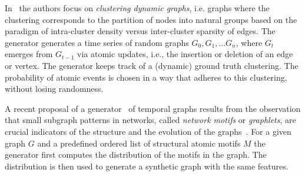 In~\cite{GoerkeKlugeSchumm2012_1000029825} the authors focus on \emph{clustering dynamic graphs}, i.e. graphs where the clustering corresponds to the partition of nodes into natural groups based on the paradigm of intra-cluster density versus inter-cluster sparsity of edges. The generator generates a time series of random graphs $G_0, G_1, ... G_n$, where $G_t$ emerges from $G_{t-1}$ via atomic updates, i.e., the insertion or deletion of an edge or vertex. The generator keeps track of a (dynamic) ground truth clustering. The probability of atomic events is chosen in a way that adheres to this clustering, without losing randomness.

A recent proposal of a generator~\cite{mlg2018_42} of temporal graphs results from the observation that small subgraph patterns in networks, called \emph{network motifs} or \emph{graphlets}, are crucial indicators of the structure and the evolution of the graphs~\cite{Paranjape:2017:MTN:3018661.3018731}. For a given graph $G$ and a predefined ordered list of structural atomic motifs $M$ the generator first computes the distribution of the motifs in the graph. The distribution is then used to generate a synthetic graph with the same features.





